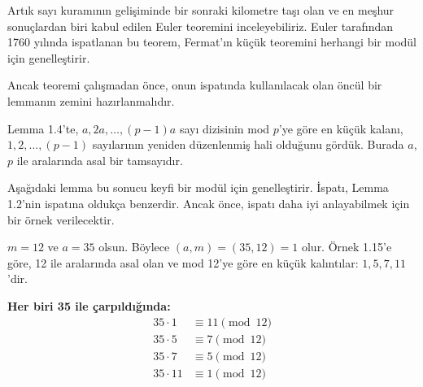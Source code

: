 \vspace{2em}

\begin{tcolorbox}[colback=blue!5, colframe=blue!60!black, title=\textbf{Euler Teoremi'ne Giriş}, fonttitle=\bfseries, sharp corners]
Artık sayı kuramının gelişiminde bir sonraki kilometre taşı olan ve en meşhur sonuçlardan biri kabul edilen Euler teoremini inceleyebiliriz. Euler tarafından 1760 yılında ispatlanan bu teorem, Fermat'ın küçük teoremini herhangi bir modül için genelleştirir.

Ancak teoremi çalışmadan önce, onun ispatında kullanılacak olan öncül bir lemmanın zemini hazırlanmalıdır.

Lemma 1.4'te, $a, 2a, \ldots, (p-1)a$ sayı dizisinin mod $p$'ye göre en küçük kalanı, $1, 2, \ldots, (p-1)$ sayılarının yeniden düzenlenmiş hali olduğunu gördük. Burada $a$, $p$ ile aralarında asal bir tamsayıdır. 

Aşağıdaki lemma bu sonucu keyfi bir modül için genelleştirir. İspatı, Lemma 1.2'nin ispatına oldukça benzerdir. Ancak önce, ispatı daha iyi anlayabilmek için bir örnek verilecektir.
\end{tcolorbox}

\vspace{2em}

\begin{tcolorbox}[colback=gray!10, colframe=black, title=\textbf{Örnek 1.21: Mod 12'de En Küçük Kalıntılar}, fonttitle=\bfseries, sharp corners]
$m = 12$ ve $a = 35$ olsun. Böylece $(a, m) = (35, 12) = 1$ olur. Örnek 1.15'e göre, 12 ile aralarında asal olan ve mod 12'ye göre en küçük kalıntılar: $1, 5, 7, 11$'dir.

\textbf{Her biri 35 ile çarpıldığında:}
\begin{align*}
35 \cdot 1 &\equiv 11 \pmod{12} \\
35 \cdot 5 &\equiv 7 \pmod{12} \\
35 \cdot 7 &\equiv 5 \pmod{12} \\
35 \cdot 11 &\equiv 1 \pmod{12}
\end{align*}
\end{tcolorbox}

\vspace{2em}

